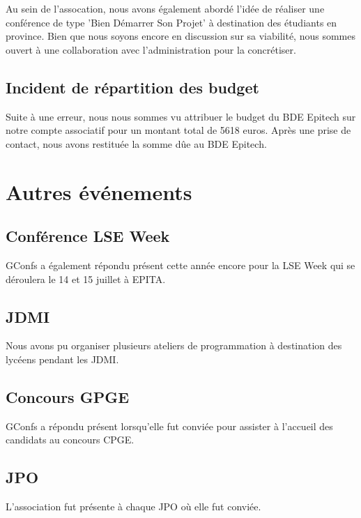 \documentclass[12pt,a4paper]{article}
\begin{document}
Au sein de l'assocation, nous avons également abordé l'idée de réaliser une conférence de type 'Bien Démarrer Son Projet' à destination des étudiants en province. Bien que nous soyons encore en discussion sur sa viabilité, nous sommes ouvert à une collaboration avec l'administration pour la concrétiser.

\subsection{Incident de répartition des budget}

Suite à une erreur, nous nous sommes vu attribuer le budget du BDE Epitech sur notre compte associatif pour un montant total de 5618 euros. Après une prise de contact, nous avons restituée la somme dûe au BDE Epitech.

\section{Autres événements}
\subsection{Conférence LSE Week}

GConfs a également répondu présent cette année encore pour la LSE Week qui se déroulera le 14 et 15 juillet à EPITA.

\subsection{JDMI}

Nous avons pu organiser plusieurs ateliers de programmation à destination des lycéens pendant les JDMI.

\subsection{Concours GPGE}

GConfs a répondu présent lorsqu'elle fut conviée pour assister à l'accueil des candidats au concours CPGE.

\subsection{JPO}

L'association fut présente à chaque JPO où elle fut conviée.
\end{document}
